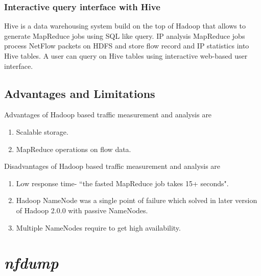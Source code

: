       \subsubsection{Interactive query interface with Hive}
      Hive is a data warehousing system build on the top of Hadoop that allows to generate MapReduce jobs using SQL like query.
      IP analysis MapReduce jobs process NetFlow packets on HDFS and  store flow record and IP statistics into
      Hive tables. A user can query on Hive tables using interactive web-based user interface.
      
      \subsection{Advantages and Limitations}
      Advantages of Hadoop based traffic  measurement and analysis are 
	\begin{enumerate}
	  \item Scalable storage.
	  \item MapReduce operations on flow data.
	\end{enumerate}
      Disadvantages of Hadoop based traffic  measurement and analysis are
	\begin{enumerate}
	 \item Low response time- ``the fasted MapReduce job takes 15+ seconds"\cite{ha}.
	 \item Hadoop NameNode was a single point of failure which solved in later version of 
	        Hadoop 2.0.0 with passive NameNodes.
	 \item Multiple NameNodes require to get high availability\cite{ha}.
	\end{enumerate}

	
      \section{\emph{nfdump}\cite{nfdump}}
